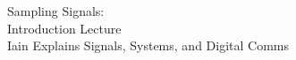 \documentclass[preview]{standalone}
\begin{document}
\begin{center}
Sampling Signals:\\Introduction Lecture\\Iain Explains Signals, Systems, and Digital Comms
\end{center}
\end{document}
